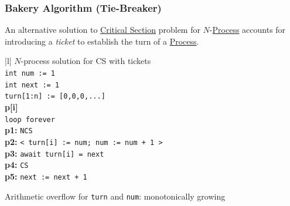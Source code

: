 \subsubsection{Bakery Algorithm (Tie-Breaker)}\label{sub:cp_bakery_algorithm_tie_breaker} %
An alternative solution to \hyperref[def:crit-sec]{Critical Section} problem for $N$-\hyperref[def:process]{Process} accounts for introducing a \textit{ticket} to establish the turn of a \hyperref[def:process]{Process}.
\begin{ctable}{|l|}
    \hline
    $N$-process solution for CS with tickets \\
    \hline
    \texttt{int num := 1} \\
    \texttt{int next := 1} \\
    \texttt{turn[1:n] := [0,0,0,...]} \\
    \hline
    \textbf{p[i]} \\
    \hline
    \texttt{loop forever} \\
    \textbf{p1:} \texttt{NCS} \\
    \textbf{p2:} \texttt{< turn[i] := num; num := num + 1 >} \\
    \textbf{p3:} \texttt{await turn[i] = next} \\
    \textbf{p4:} \texttt{CS} \\
    \textbf{p5:} \texttt{next := next + 1} \\
    \hline
\end{ctable}
\begin{note}
    Arithmetic overflow for \texttt{turn} and \texttt{num}: monotonically growing
\end{note}
%
